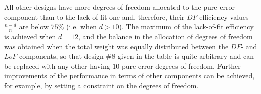 All other designs have more degrees of freedom allocated to the pure error component than to the lack-of-fit one and, therefore, their $DF$-efficiency values $\frac{n-d}{n}$ are below $75\%$ (i.e. when $d>10$). The maximum of the lack-of-fit efficiency is achieved when $d=12$, and the balance in the allocation of degrees of freedom was obtained when the total weight was equally distributed between the $DF$- and $LoF$-components, so that design \#$8$ given in the table is quite arbitrary and can be replaced with any other having $10$ pure error degrees of freedom. Further improvements of the performance in terms of other components can be achieved, for example, by setting a constraint on the degrees of freedom.
\begin{table}[h]
\centering
\caption{Example 1. D-optimal design (\#$1$ and \#$4$)}
\label{tab::design1}
\end{table} 
